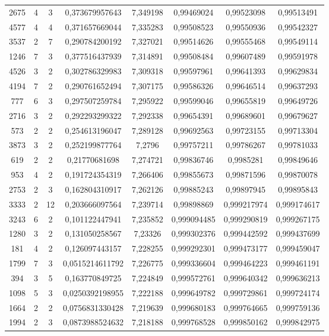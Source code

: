 \begin{longtable}{|c|c|c|c|c|c|c|c|}
2675 & 4 & 3 & 0,373679957643 & 7,349198 & 0,99469024 & 0,99523098 & 0,99513491 \\
4577 & 4 & 4 & 0,371657669044 & 7,335283 & 0,99508523 & 0,99550936 & 0,99542327 \\
3537 & 2 & 7 & 0,290784200192 & 7,327021 & 0,99514626 & 0,99555468 & 0,99549114 \\
1246 & 7 & 3 & 0,377516437939 & 7,314891 & 0,99508484 & 0,99607489 & 0,99591978 \\
4526 & 3 & 2 & 0,302786329983 & 7,309318 & 0,99597961 & 0,99641393 & 0,99629834 \\
4194 & 7 & 2 & 0,290761652494 & 7,307175 & 0,99586326 & 0,99646514 & 0,99637293 \\
777 & 6 & 3 & 0,297507259784 & 7,295922 & 0,99599046 & 0,99655819 & 0,99649726 \\
2716 & 3 & 2 & 0,292293299322 & 7,292338 & 0,99654391 & 0,99689601 & 0,99679627 \\
573 & 2 & 2 & 0,254613196047 & 7,289128 & 0,99692563 & 0,99723155 & 0,99713304 \\
3873 & 3 & 2 & 0,252199877764 & 7,2796 & 0,99757211 & 0,99786267 & 0,99781033 \\
619 & 2 & 2 & 0,21770681698 & 7,274721 & 0,99836746 & 0,9985281 & 0,99849646 \\
953 & 4 & 2 & 0,191724354319 & 7,266406 & 0,99855673 & 0,99871596 & 0,99870078 \\
2753 & 2 & 3 & 0,162804310917 & 7,262126 & 0,99885243 & 0,99897945 & 0,99895843 \\
3333 & 2 & 12 & 0,203666097564 & 7,239714 & 0,99898869 & 0,999217974 & 0,999174617 \\
3243 & 6 & 2 & 0,101122447941 & 7,235852 & 0,999094485 & 0,999290819 & 0,999267175 \\
1280 & 3 & 2 & 0,131050258567 & 7,23326 & 0,999302376 & 0,999442592 & 0,999437699 \\
181 & 4 & 2 & 0,126097443157 & 7,228255 & 0,999292301 & 0,999473177 & 0,999459047 \\
1799 & 7 & 3 & 0,0515214611792 & 7,226775 & 0,999336604 & 0,999464223 & 0,999461191 \\
394 & 3 & 5 & 0,163770849725 & 7,224849 & 0,999572761 & 0,999640342 & 0,999636213 \\
1098 & 5 & 3 & 0,0250392198955 & 7,222188 & 0,999649782 & 0,999729861 & 0,999724174 \\
1664 & 2 & 2 & 0,0756831330428 & 7,219639 & 0,999680183 & 0,999764665 & 0,999759136 \\
1994 & 2 & 3 & 0,0873988524632 & 7,218188 & 0,999768528 & 0,999850162 & 0,999842975 \\

\end{longtable}
